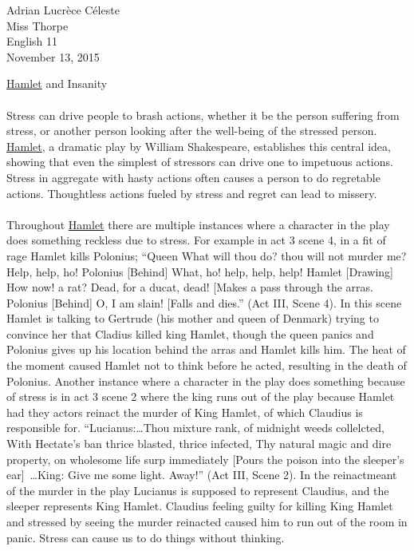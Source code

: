 \doublespacing{}
\noindent
Adrian Lucr\`{e}ce C\'{e}leste \\
Miss Thorpe \\
English 11 \\
November 13, 2015

\begin{center}
\underline{Hamlet} and Insanity
\end{center}
\paragraph{}
Stress can drive people to brash actions, whether it be the person suffering from
stress, or another person looking after the well-being of the stressed person.
\underline{Hamlet}, a dramatic play by William Shakespeare, establishes this
central idea, showing that even the simplest of stressors can drive one to
impetuous actions. Stress in aggregate with hasty actions often causes a person
to do regretable actions. Thoughtless actions fueled by stress and regret can
lead to missery.

\paragraph{}
Throughout \underline{Hamlet} there are multiple instances where a character in
the play does something reckless due to stress. For example in act 3 scene 4, in
a fit of rage Hamlet kills Polonius; ``Queen What will thou do? thou will not 
murder me? Help, help, ho! Polonius [Behind] What, ho! help, help, help! Hamlet 
[Drawing] How now!  a rat? Dead, for a ducat, dead! [Makes a pass through the
arras. Polonius [Behind] O, I am slain! [Falls and dies.'' (Act III, Scene 4).
In this scene Hamlet is talking to Gertrude (his mother and queen of Denmark)
trying to convince her that Cladius killed king Hamlet, though the queen panics
and Polonius gives up his location behind the arras and Hamlet kills him. The 
heat of the moment caused Hamlet not to think before he acted, resulting in the
death of Polonius. Another instance where a character in the play does something
because of stress is in act 3 scene 2 where the king runs out of the play
because Hamlet had they actors reinact the murder of King Hamlet, of which
Claudius is responsible for. ``Lucianus:\ldots{}Thou mixture rank, of midnight weeds
collelcted, With Hectate's ban thrice blasted, thrice infected, Thy natural 
magic and dire property, on wholesome life surp immediately [Pours the poison
into the sleeper's ear]~\ldots{}King: Give me some light. Away!'' (Act III, Scene 2).
In the reinactmeant of the murder in the play Lucianus is supposed to represent
Claudius, and the sleeper represents King Hamlet. Claudius feeling guilty for
killing King Hamlet and stressed by seeing the murder reinacted caused him to
run out of the room in panic. Stress can cause us to do things without thinking.

